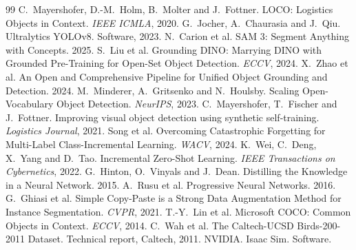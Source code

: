 \documentclass[11pt,a4paper]{article}
\begin{document}
\begin{thebibliography}{99}
 C.~Mayershofer, D.-M.~Holm, B.~Molter and J.~Fottner.
  LOCO: Logistics Objects in Context. \emph{IEEE ICMLA}, 2020.
 G.~Jocher, A.~Chaurasia and J.~Qiu. Ultralytics YOLOv8. Software, 2023.
 N.~Carion et al. SAM 3: Segment Anything with Concepts. 2025.
 S.~Liu et al. Grounding DINO: Marrying DINO with Grounded
  Pre-Training for Open-Set Object Detection. \emph{ECCV}, 2024.
 X.~Zhao et al. An Open and Comprehensive Pipeline for Unified
  Object Grounding and Detection. 2024.
 M.~Minderer, A.~Gritsenko and N.~Houlsby. Scaling Open-Vocabulary
  Object Detection. \emph{NeurIPS}, 2023.
 C.~Mayershofer, T.~Fischer and J.~Fottner. Improving visual
  object detection using synthetic self-training. \emph{Logistics Journal}, 2021.
 Song et al. Overcoming Catastrophic Forgetting for Multi-Label
  Class-Incremental Learning. \emph{WACV}, 2024.
 K.~Wei, C.~Deng, X.~Yang and D.~Tao. Incremental Zero-Shot Learning.
  \emph{IEEE Transactions on Cybernetics}, 2022.
 G.~Hinton, O.~Vinyals and J.~Dean. Distilling the Knowledge in a
  Neural Network. 2015.
 A.~Rusu et al. Progressive Neural Networks. 2016.
 G.~Ghiasi et al. Simple Copy-Paste is a Strong Data
  Augmentation Method for Instance Segmentation. \emph{CVPR}, 2021.
 T.-Y.~Lin et al. Microsoft COCO: Common Objects in Context.
  \emph{ECCV}, 2014.
 C.~Wah et al. The Caltech-UCSD Birds-200-2011 Dataset. Technical
  report, Caltech, 2011.
 NVIDIA. Isaac Sim. Software.
\end{thebibliography}
\end{document}
